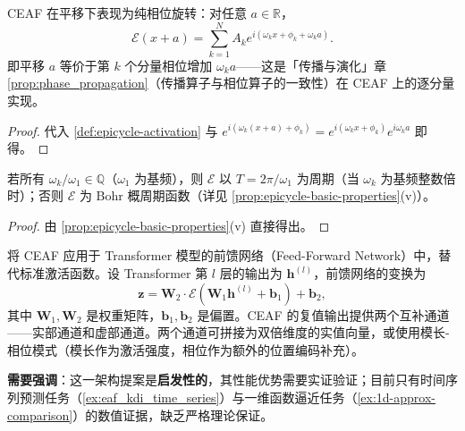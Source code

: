 \begin{proposition}\label{prop:ceaf_propagation}
CEAF 在平移下表现为纯相位旋转：对任意 $a\in\mathbb{R}$，
\[
\mathcal{E}(x+a) = \sum_{k=1}^{N}A_k e^{i(\omega_k x+\phi_k+\omega_k a)}.
\]
即平移 $a$ 等价于第 $k$ 个分量相位增加 $\omega_k a$——这是「传播与演化」章 \cref{prop:phase_propagation}（传播算子与相位算子的一致性）在 CEAF 上的逐分量实现。
\end{proposition}

\begin{proof}
代入 \cref{def:epicycle-activation} 与 $e^{i(\omega_k(x+a)+\phi_k)} = e^{i(\omega_k x+\phi_k)}e^{i\omega_k a}$ 即得。
\end{proof}

\begin{corollary}\label{cor:ceaf_period_agent}
若所有 $\omega_k/\omega_1 \in \mathbb{Q}$（$\omega_1$ 为基频），则 $\mathcal{E}$ 以 $T = 2\pi/\omega_1$ 为周期（当 $\omega_k$ 为基频整数倍时）；否则 $\mathcal{E}$ 为 Bohr 概周期函数（详见 \cref{prop:epicycle-basic-properties}(v)）。
\end{corollary}

\begin{proof}
由 \cref{prop:epicycle-basic-properties}(v) 直接得出。
\end{proof}

\begin{remark}\label{prop:eaf_transformer}
将 CEAF 应用于 Transformer 模型的前馈网络（Feed-Forward Network）中，替代标准激活函数。设 Transformer 第 $l$ 层的输出为 $\mathbf{h}^{(l)}$，前馈网络的变换为
\[
\mathbf{z} = \mathbf{W}_2 \cdot \mathcal{E}(\mathbf{W}_1 \mathbf{h}^{(l)} + \mathbf{b}_1) + \mathbf{b}_2,
\]
其中 $\mathbf{W}_1, \mathbf{W}_2$ 是权重矩阵，$\mathbf{b}_1, \mathbf{b}_2$ 是偏置。CEAF 的复值输出提供两个互补通道——实部通道和虚部通道。两个通道可拼接为双倍维度的实值向量，或使用模长-相位模式（模长作为激活强度，相位作为额外的位置编码补充）。

\textbf{需要强调}：这一架构提案是\textbf{启发性的}，其性能优势需要实证验证；目前只有时间序列预测任务（\cref{ex:eaf_kdi_time_series}）与一维函数逼近任务（\cref{ex:1d-approx-comparison}）的数值证据，缺乏严格理论保证。
\end{remark}

